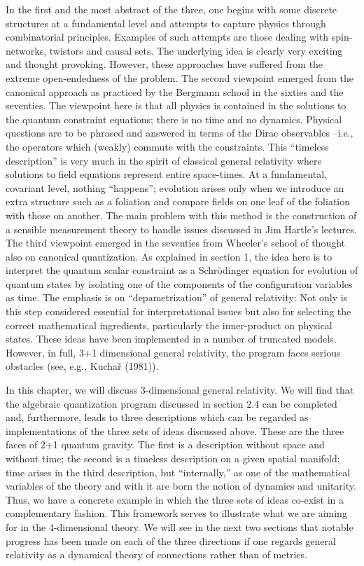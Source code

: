 In the first and the most abstract of the three, one begins with some
discrete structures at a fundamental level and attempts to
capture physics through combinatorial principles. Examples of such attempts
are those dealing with spin-networks, twistors and causal sets. The underlying
idea is clearly very exciting and thought provoking. However, these approaches
have suffered from the extreme open-endedness of the problem. The second
viewpoint emerged from the canonical approach as practiced by the Bergmann
school in the sixties and the seventies. The viewpoint here is that all
physics is contained in the solutions to the quantum constraint equations;
there is no time and no dynamics. Physical questions are to be phrased and
answered in terms of the Dirac observables --i.e., the operators which (weakly)
commute with the constraints. This ``timeless description'' is very much in
the spirit of classical general relativity where solutions to field equations
represent entire space-times. At a fundamental, covariant level, nothing
``happens''; evolution arises only when we introduce an extra structure such
as a foliation and compare fields on one leaf of the foliation with those
on another. The main problem with this method is the construction of a sensible
measurement theory to handle issues discussed in Jim Hartle's lectures.
The third viewpoint emerged in the seventies from Wheeler's school of thought
also on canonical quantization. As explained in section 1, the idea here
is to interpret the quantum scalar constraint as a Schr\"odinger equation for
evolution of quantum states by isolating one of the components of the
configuration variables as time. The emphasis is on ``depametrization'' of
general relativity: Not only is this step considered essential for
interpretational issues but also
for selecting the correct mathematical ingredients, particularly the
inner-product on physical states. These ideas have been implemented in a
number of truncated models. However, in full, 3+1 dimensional general
relativity, the program faces serious obstacles (see, e.g., Kucha\v r
(1981)).

In this chapter, we will discuss 3-dimensional general relativity. We will
find that the algebraic quantization program discussed in section 2.4 can
be completed and, furthermore, leads to three descriptions which can be
regarded as implementations of the three sets of ideas discussed above.
These are the three faces of 2+1 quantum gravity. The first is
a description without space and without time; the second is a timeless
description on a given spatial manifold; time arises in the third description,
but ``internally,'' as one of the mathematical variables of the theory
and with it are born the notion of dynamics and unitarity. Thus, we have a
concrete example in which the three sets of ideas co-exist in a complementary
fashion. This framework serves to illustrate what we are aiming for in the
4-dimensional theory. We will see in the next two sections that notable
progress has been made on each of the three directions if one regards
general relativity as a dynamical theory of connections rather than of
metrics.

